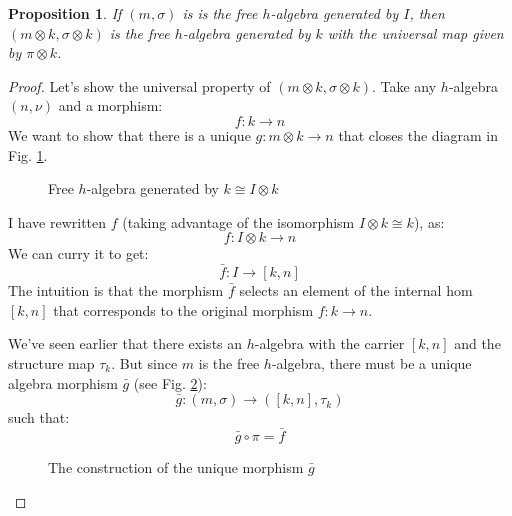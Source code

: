 \documentclass[letterpaper, 10 pt, conference]{ieeeconf}
\newtheorem{proposition}{Proposition}[section]
\begin{document}
\begin{proposition}
If $(m, \sigma)$ is is the free $h$-algebra generated by $I$, then $(m \otimes k, \sigma \otimes k)$ is the free $h$-algebra generated by $k$ with the universal map given by $\pi \otimes k$.
\end{proposition}
\begin{proof}
Let's show the universal property of $(m \otimes k, \sigma \otimes k)$. Take any $h$-algebra $(n, \nu)$ and a morphism:
\[f \colon k \to n\] 
We want to show that there is a unique $g \colon m \otimes k \to n$ that closes the diagram in Fig. \ref{fig-freeik}.
\begin{figure}[h]
\centering
{}
\caption{Free $h$-algebra generated by $k \cong I \otimes k$}
\label{fig-freeik}
\end{figure}

I have rewritten $f$ (taking advantage of the isomorphism $I \otimes k \cong k$), as:
\[f \colon I \otimes k \to n\]
We can curry it to get:
\[\bar{f} \colon I \to [k, n]\]
The intuition is that the morphism $\bar{f}$ selects an element of the internal hom $[k, n]$ that corresponds to the original morphism $f \colon k \to n$.

We've seen earlier that there exists an $h$-algebra with the carrier $[k, n]$ and the structure map $\tau_k$. But since $m$ is the free $h$-algebra, there must be a unique algebra morphism $\bar{g}$ (see Fig. \ref{fig-uniq}):
\[ \bar{g} \colon (m, \sigma) \to ([k, n], \tau_k)\]
such that:
\[\bar{g} \circ \pi = \bar{f}\]
\begin{figure}[h]
\centering
{}
\caption{The construction of the unique morphism $\bar{g}$}
\label{fig-uniq}
\end{figure}


\end{proof}
\end{document}
